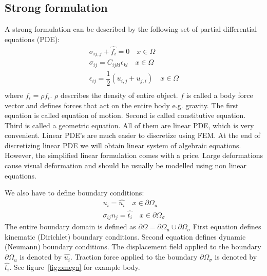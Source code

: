 \documentclass[en]{minipw} %
\begin{document}
\subsection{Strong formulation}
A strong formulation can be described by the following set of partial differential equations (PDE):
\begin{equation}
\begin{aligned}
\sigma_{ij,j} + \hat{f_{i}} = 0 \quad x \in \Omega
\\
\sigma_{ij} = C_{ijkl} \epsilon_{kl} \quad x \in \Omega
\\
\epsilon_{ij} = \dfrac{1}{2}(u_{i,j} + u_{j,i}) \quad x \in \Omega
\\
\end{aligned}
\end{equation}
where $\hat{f_{i}} = \rho f_i$. $\rho$ describes the density of entire object. $f$ is called a body force vector and defines forces that act on the entire body e.g. gravity. The first equation is called equation of motion. Second is called constitutive equation. Third is called a geometric equation. All of them are linear  PDE, which is very convenient. Linear PDE's are much easier to discretize using FEM. At the end of discretizing linear PDE we will obtain linear system of algebraic equations. However, the simplified linear formulation comes with a price. Large deformations cause visual deformation and should be usually be modelled using non linear equations.

We also have to define boundary conditions:
\begin{equation}
\begin{aligned}
u_i = \hat{u_i} \quad x \in \partial  \Omega_{u}
\\
\sigma_{ij} n_{j} = \hat{t_i} \quad x \in \partial \Omega_{\sigma}
\end{aligned}
\end{equation}
The entire boundary domain is defined as $\partial \Omega = \partial \Omega_{u} \cup \partial \Omega_{\sigma}$
First equation defines kinematic (Dirichlet) boundary conditions. Second equation defines dynamic (Neumann) boundary conditions. The displacement field applied to the boundary $\partial \Omega_{u}$ is denoted by $\hat{u_i}$. Traction force applied to the boundary $\partial \Omega_{\sigma}$ is denoted by $\hat{t_i}$. See figure~\ref{fig:omega} for example body.
\end{document}
